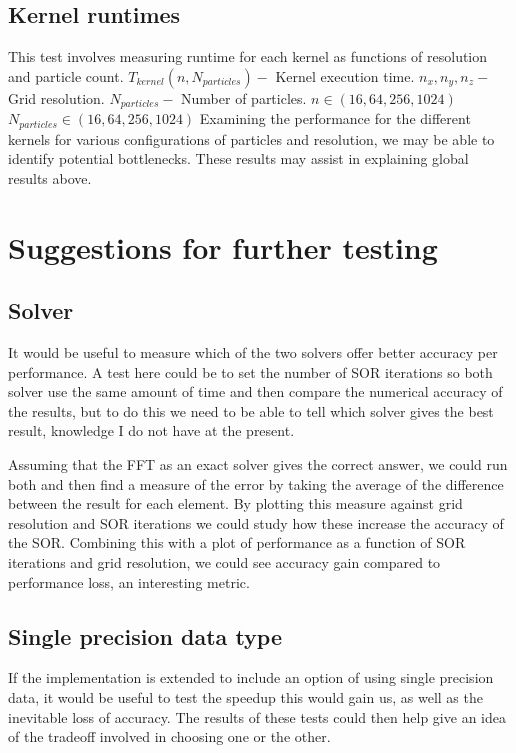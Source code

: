 \subsection{Kernel runtimes}
This test involves measuring runtime for each kernel as functions of resolution and particle count.
	{$T_{kernel}(n, N_{particles}) -$ Kernel execution time.}
	{$n_x, n_y, n_z -$ Grid resolution.\newline
	  $N_{particles} -$ Number of particles.}
	{$n\in(16, 64, 256, 1024)$\newline
	  $N_{particles} \in (16, 64, 256, 1024)$}
	{Examining the performance for the different kernels for various configurations of particles and resolution, we may be
	able to identify potential bottlenecks. These results may assist in explaining global results above.}

\section{Suggestions for further testing}
\subsection{Solver}
It would be useful to measure which of the two solvers offer better accuracy per performance. A test here could be to
set the number of SOR iterations so both solver use the same amount of time and then compare the numerical accuracy of
the results, but to do this we need to be able to tell which solver gives the best result, knowledge I do not have at
the present.

Assuming that the FFT as an exact solver gives the correct answer, we could run both and then find a measure of the
error by taking the average of the difference between the result for each element. By plotting this measure against grid
resolution and SOR iterations we could study how these increase the accuracy of the SOR. Combining this with a plot of
performance as a function of SOR iterations and grid resolution, we could see accuracy gain compared to performance loss,
an interesting metric.

\subsection{Single precision data type}
If the implementation is extended to include an option of using single precision data, it would be useful to test the
speedup this would gain us, as well as the inevitable loss of accuracy. The results of these tests could then help
give an idea of the tradeoff involved in choosing one or the other.

